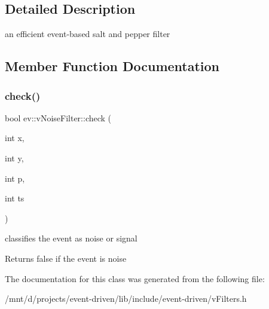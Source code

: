 \subsection{Detailed Description}
an efficient event-\/based salt and pepper filter 

\subsection{Member Function Documentation}
\mbox{\label{classev_1_1vNoiseFilter_a8aa612fbfc163398c600853329768892}} 
\subsubsection{\texorpdfstring{check()}{check()}}
{\footnotesize\ttfamily bool ev\+::v\+Noise\+Filter\+::check (\begin{DoxyParamCaption}\item[{int}]{x,  }\item[{int}]{y,  }\item[{int}]{p,  }\item[{int}]{ts }\end{DoxyParamCaption})\hspace{0.3cm}{\ttfamily [inline]}}



classifies the event as noise or signal 

\begin{DoxyReturn}{Returns}
false if the event is noise 
\end{DoxyReturn}


The documentation for this class was generated from the following file\+:\begin{DoxyCompactItemize}
\item 
/mnt/d/projects/event-\/driven/lib/include/event-\/driven/v\+Filters.\+h\end{DoxyCompactItemize}
